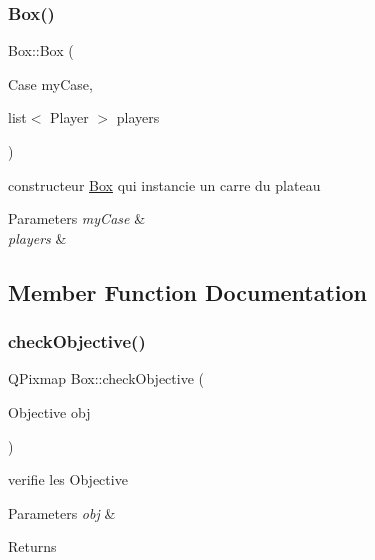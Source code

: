 \subsubsection{\texorpdfstring{Box()}{Box()}}
{\footnotesize\ttfamily Box\+::\+Box (\begin{DoxyParamCaption}\item[{Case}]{my\+Case,  }\item[{list$<$ Player $>$}]{players }\end{DoxyParamCaption})}



constructeur \mbox{\hyperlink{class_box}{Box}} qui instancie un carre du plateau 


\begin{DoxyParams}{Parameters}
{\em my\+Case} & \\
\hline
{\em players} & \\
\hline
\end{DoxyParams}


\subsection{Member Function Documentation}
\mbox{\label{class_box_a3db8ad83e6f0562417ce3d9d9b682316}} 
\subsubsection{\texorpdfstring{check\+Objective()}{checkObjective()}}
{\footnotesize\ttfamily Q\+Pixmap Box\+::check\+Objective (\begin{DoxyParamCaption}\item[{Objective}]{obj }\end{DoxyParamCaption})}



verifie les Objective 


\begin{DoxyParams}{Parameters}
{\em obj} & \\
\hline
\end{DoxyParams}
\begin{DoxyReturn}{Returns}

\end{DoxyReturn}
\mbox{\label{class_box_a84a5d7227a3ecf4e5d207485b21ff904}} 
